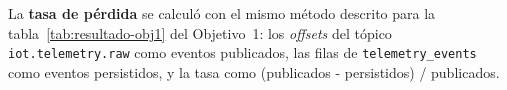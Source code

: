 La \textbf{tasa de pérdida} se calculó con el mismo método descrito para la tabla~\ref{tab:resultado-obj1} del Objetivo~1: los \textit{offsets} del tópico \texttt{iot.telemetry.raw} como eventos publicados, las filas de \texttt{telemetry\_events} como eventos persistidos, y la tasa como (publicados - persistidos) / publicados.
